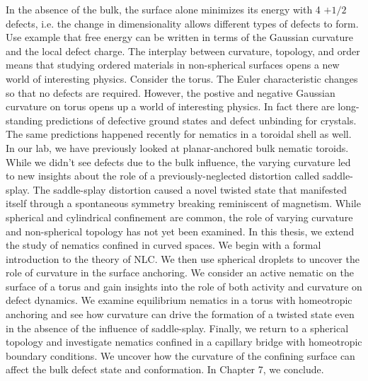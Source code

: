 In the absence of the bulk, the surface alone minimizes its energy with 4 $+1/2$ defects, i.e. the change in dimensionality allows different types of defects to form.
Use example that free energy can be written in terms of the Gaussian curvature and the local defect charge.
The interplay between curvature, topology, and order means that studying ordered materials in non-spherical surfaces opens a new world of interesting physics.
Consider the torus.
The Euler characteristic changes so that no defects are required.
However, the postive and negative Gaussian curvature on torus opens up a world of interesting physics.
In fact there are long-standing predictions of defective ground states and defect unbinding for crystals.
The same predictions happened recently for nematics in a toroidal shell as well.
In our lab, we have previously looked at planar-anchored bulk nematic toroids.
While we didn't see defects due to the bulk influence, the varying curvature led to new insights about the role of a previously-neglected distortion called saddle-splay.
The saddle-splay distortion caused a novel twisted state that manifested itself through a spontaneous symmetry breaking reminiscent of magnetism.
While spherical and cylindrical confinement are common, the role of varying curvature and non-spherical topology has not yet been examined.
In this thesis, we extend the study of nematics confined in curved spaces.
We begin with a formal introduction to the theory of NLC.
We then use spherical droplets to uncover the role of curvature in the surface anchoring.
We consider an active nematic on the surface of a torus and gain insights into the role of both activity and curvature on defect dynamics.
We examine equilibrium nematics in a torus with homeotropic anchoring and see how curvature can drive the formation of a twisted state even in the absence of the influence of saddle-splay.
Finally, we return to a spherical topology and investigate nematics confined in a capillary bridge with homeotropic boundary conditions.
We uncover how the curvature of the confining surface can affect the bulk defect state and conformation.
In Chapter 7, we conclude.
